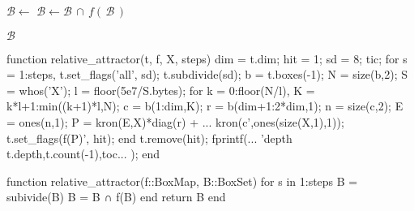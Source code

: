 \documentclass[12pt,a4paper,twoside]{article}
\begin{document}

\begin{algorithm}
    \begin{algorithmic}[1]

            \State $\mathcal{B} \gets$ 
            \State $\mathcal{B} \gets \mathcal{B}\, \cap\, f (\,\mathcal{B}\,)$
        \EndFor

        \State \Return $\mathcal{B}$ 
    \end{algorithmic}
\end{algorithm}

\clearpage

\pagebreak

\begin{jllisting}[float, language=matlab, style=jlcodestyle, label=lst:gum:matlab, captionpos=b]
function relative_attractor(t, f, X, steps)
dim = t.dim; hit = 1; sd = 8; tic;
for s = 1:steps,
    t.set_flags('all', sd);
    t.subdivide(sd);
    b = t.boxes(-1); N = size(b,2);
    S = whos('X'); l = floor(5e7/S.bytes);
    for k = 0:floor(N/l), 
        K = k*l+1:min((k+1)*l,N);
        c = b(1:dim,K);  
        r = b(dim+1:2*dim,1);  
        n = size(c,2); E = ones(n,1);       
        P = kron(E,X)*diag(r) + ...  
            kron(c',ones(size(X,1),1));
        t.set_flags(f(P)', hit); 
    end
    t.remove(hit); 
    fprintf(...
        'depth %
        t.depth,t.count(-1),toc...
    );
end
\end{jllisting}

\clearpage

\pagebreak

\begin{jllisting}[float, language=julia, style=jlcodestyle, label=lst:gum:julia, captionpos=b]
    function relative_attractor(f::BoxMap, B::BoxSet)
        for s in 1:steps
            B = subivide(B)
            B = B ∩ f(B)
        end
        return B
    end
\end{jllisting}
\end{document}
